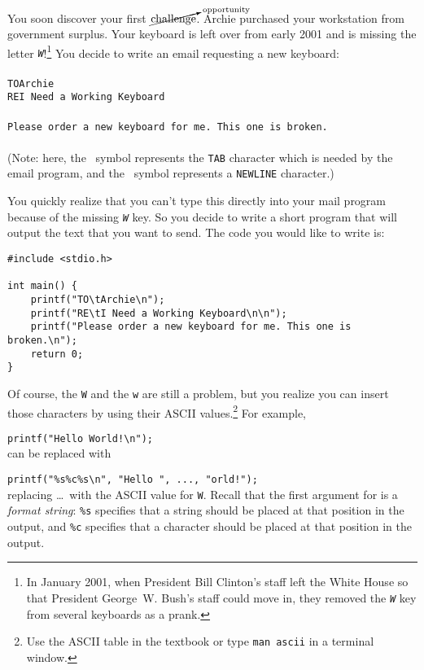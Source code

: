 You soon discover your first $\cancelto{\mathrm{opportunity}}{\mathrm{challenge}}$.
Archie purchased your workstation from government surplus.
Your keyboard is left over from early 2001 and is missing the letter \textit{\texttt{W}}!\footnote{In January 2001, when President Bill Clinton's staff left the White House so that President George~W. Bush's staff could move in, they removed the \textit{\texttt{W}} key from several keyboards as a prank.}
You decide to write an email requesting a new keyboard: \\
\\
\texttt{TO\tab Archie\nl} \\
\texttt{RE\tab I Need a Working Keyboard\nl} \\
\nl \\
\texttt{Please order a new keyboard for me. This one is broken.\nl } \\ \\
(Note: here, the \tab\ symbol represents the \texttt{TAB} character which is needed by the email program, and the \nl\ symbol represents a \texttt{NEWLINE} character.)

You quickly realize that you can't type this directly into your mail program because of the missing \textit{\texttt{W}} key.
So you decide to write a short program that will output the text that you want to send.
The code you would like to write is:

\begin{lstlisting}
#include <stdio.h>

int main() {
    printf("TO\tArchie\n");
    printf("RE\tI Need a Working Keyboard\n\n");
    printf("Please order a new keyboard for me. This one is broken.\n");
    return 0;
}
\end{lstlisting}

Of course, the \texttt{W} and the \texttt{w} are still a problem, but you realize you can insert those characters by using their ASCII values.\footnote{Use the ASCII table in the textbook or type \texttt{man ascii} in a terminal window.}
For example,

\lstinline{printf("Hello World!\n");} \\
can be replaced with

\lstinline{printf("%s%c%s\n", "Hello ", ..., "orld!");} \\
replacing \dots\ with the ASCII value for \texttt{W}.
Recall that the first argument for  is a \textit{format string}: \texttt{\%s} specifies that a string should be placed at that position in the output, and \texttt{\%c} specifies that a character should be placed at that position in the output.

